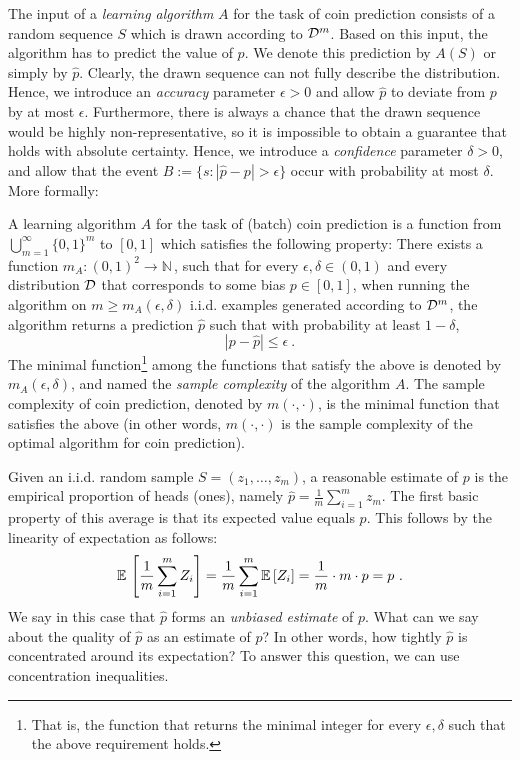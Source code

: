 \documentclass[11pt]{article}
\newcommand{\bN}{\mathbb{N}\,}
\begin{document}
The input of a \emph{learning algorithm} $A$ for the task of coin prediction
consists of a random sequence $S$ which is drawn according to
$\mathcal{D}^m$. Based on this input, the algorithm has to predict the value
of $p$. We denote this prediction by $A(S)$ or simply by
$\hat{p}$. Clearly, the drawn sequence can not fully describe the
distribution. Hence, we introduce an \emph{accuracy} parameter $\epsilon>0$
and allow $\hat{p}$ to deviate from $p$ by at most $\epsilon$. Furthermore, there is always a chance that the drawn sequence would be highly non-representative, so it is impossible to obtain a guarantee that holds with absolute certainty. Hence, we introduce a
\emph{confidence} parameter $\delta>0$, and allow that
the event $B:=\{s : |\hat{p}-p|>\epsilon\}$ occur with probability at
most $\delta$. More formally:
\begin{definition}  \label{def:sampleCoin}
A learning algorithm $A$ for the task of (batch) coin prediction is a function
from $\bigcup_{m=1} ^\infty \{0,1\}^m$ to $[0,1]$ which satisfies the following
property: There exists a function $m_A:
(0,1)^2 \rightarrow \bN$, such that for every $\epsilon,\delta
\in (0,1)$ and every distribution $\mathcal{D}$ that corresponds to some
bias $p \in [0,1]$, when running the algorithm on $m \ge m_A(\epsilon,\delta)$
i.i.d. examples generated according to $\mathcal{D}^m$,
the algorithm returns a prediction $\hat{p}$ such that with
probability at least $1-\delta$,
\[
|p-\hat{p}| \le \epsilon~.
\]
The minimal function\footnote{That is, the function that returns the minimal integer for every $\epsilon,\delta$ such that the above requirement holds.} among the functions that satisfy the above is denoted by $m_A(\epsilon,\delta)$, and named the \emph{sample complexity} of the algorithm $A$. The sample complexity of coin prediction, denoted by $m(\cdot,\cdot)$, is the minimal function that satisfies the above (in other words, $m(\cdot, \cdot)$ is the sample complexity of the optimal algorithm for coin prediction).
\end{definition}

Given an i.i.d. random sample $S=(z_1, \ldots, z_m)$, a reasonable
estimate of $p$ is the empirical proportion of heads (ones), namely
$\hat{p}=\frac{1}{m} \sum_{i=1} ^m z_m$. The first basic property of
this average is that its expected value equals $p$. This follows by
the linearity of expectation as follows:
\[
\mathbb{E}\, \left [\frac{1}{m} \sum_{i=1} ^m Z_i \right] = \frac{1}{m} \sum_{i=1} ^m
\mathbb{E}\,[Z_i] = \frac{1}{m} \cdot m \cdot p = p~.
\]
We say in this case that $\hat{p}$ forms an \emph{unbiased estimate}
of $p$. What can we say about the quality of $\hat{p}$ as an estimate
of $p$? In other words, how tightly $\hat{p}$ is concentrated around
its expectation? To answer this question, we can use concentration inequalities.\\
\end{document}

